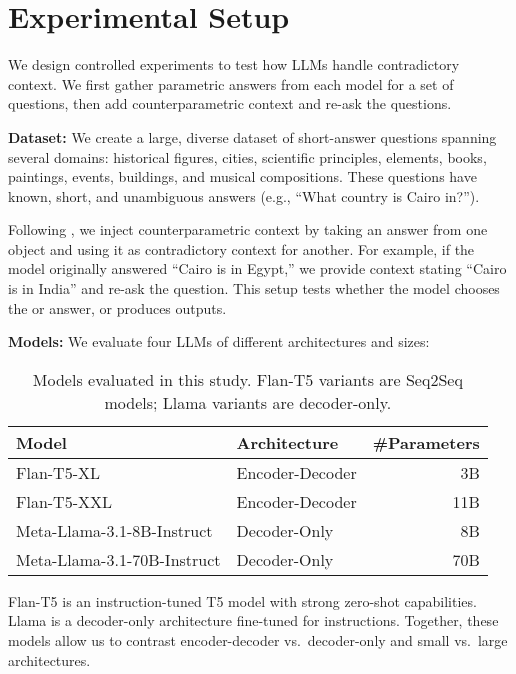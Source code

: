 \section{Experimental Setup}

We design controlled experiments to test how LLMs handle contradictory context. We first gather parametric answers from each model for a set of questions, then add counterparametric context and re-ask the questions.

\textbf{Dataset:}
We create a large, diverse dataset of short-answer questions spanning several domains: historical figures, cities, scientific principles, elements, books, paintings, events, buildings, and musical compositions. These questions have known, short, and unambiguous answers (e.g., “What country is Cairo in?”).

Following \citet{factual_recall}, we inject counterparametric context by taking an answer from one object and using it as contradictory context for another. For example, if the model originally answered “Cairo is in Egypt,” we provide context stating “Cairo is in India” and re-ask the question. This setup tests whether the model chooses the \Contextual{} or \Parametric{} answer, or produces \Other{} outputs.

\textbf{Models:}
We evaluate four LLMs of different architectures and sizes:

\begin{table}[t]
\centering
\small
\begin{tabular}{l l r}
\toprule
Model & Architecture & \#Parameters \\
\midrule
Flan-T5-XL   & Encoder-Decoder & 3B \\
Flan-T5-XXL  & Encoder-Decoder & 11B \\
Meta-Llama-3.1-8B-Instruct   & Decoder-Only & 8B \\
Meta-Llama-3.1-70B-Instruct  & Decoder-Only & 70B \\
\bottomrule
\end{tabular}
\caption{Models evaluated in this study. Flan-T5 variants are Seq2Seq models; Llama variants are decoder-only.}
\label{tab:models}
\end{table}

Flan-T5 \citep{flant5} is an instruction-tuned T5 model \citep{t5} with strong zero-shot capabilities. Llama \citep{llama3} is a decoder-only architecture fine-tuned for instructions. Together, these models allow us to contrast encoder-decoder vs.\ decoder-only and small vs.\ large architectures.

